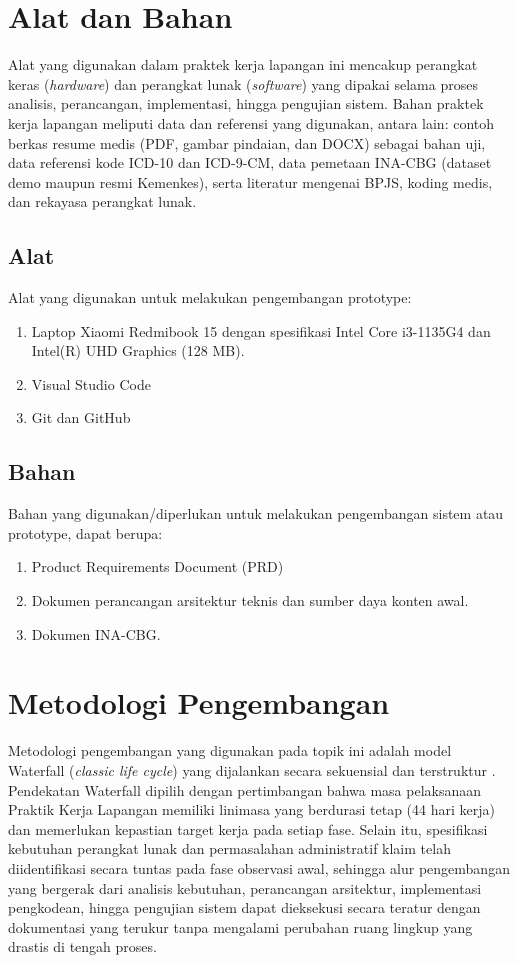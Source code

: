 \section{Alat dan Bahan}
Alat yang digunakan dalam praktek kerja lapangan ini mencakup perangkat keras (\textit{hardware}) dan perangkat lunak (\textit{software}) yang dipakai selama proses analisis, perancangan, implementasi, hingga pengujian sistem. Bahan praktek kerja lapangan meliputi data dan referensi yang digunakan, antara lain: contoh berkas resume medis (PDF, gambar pindaian, dan DOCX) sebagai bahan uji, data referensi kode ICD-10 dan ICD-9-CM, data pemetaan INA-CBG (dataset demo maupun resmi Kemenkes), serta literatur mengenai BPJS, koding medis, dan rekayasa perangkat lunak.

\subsection{Alat}
Alat yang digunakan untuk melakukan pengembangan prototype:
\begin{enumerate}
  \item Laptop Xiaomi Redmibook 15 dengan spesifikasi Intel Core i3-1135G4 dan Intel(R) UHD Graphics (128 MB).
  \item Visual Studio Code
  \item Git dan GitHub
\end{enumerate}

\subsection{Bahan}
Bahan yang digunakan/diperlukan untuk melakukan pengembangan sistem atau prototype, dapat berupa:
\begin{enumerate}
  \item Product Requirements Document (PRD)
  \item Dokumen perancangan arsitektur teknis dan sumber daya konten awal.
  \item Dokumen INA-CBG.
\end{enumerate}

\section{Metodologi Pengembangan}
Metodologi pengembangan yang digunakan pada topik ini adalah model Waterfall (\textit{classic life cycle}) yang dijalankan secara sekuensial dan terstruktur \cite{20}. Pendekatan Waterfall dipilih dengan pertimbangan bahwa masa pelaksanaan Praktik Kerja Lapangan memiliki linimasa yang berdurasi tetap (44 hari kerja) dan memerlukan kepastian target kerja pada setiap fase. Selain itu, spesifikasi kebutuhan perangkat lunak dan permasalahan administratif klaim telah diidentifikasi secara tuntas pada fase observasi awal, sehingga alur pengembangan yang bergerak dari analisis kebutuhan, perancangan arsitektur, implementasi pengkodean, hingga pengujian sistem dapat dieksekusi secara teratur dengan dokumentasi yang terukur tanpa mengalami perubahan ruang lingkup yang drastis di tengah proses.

